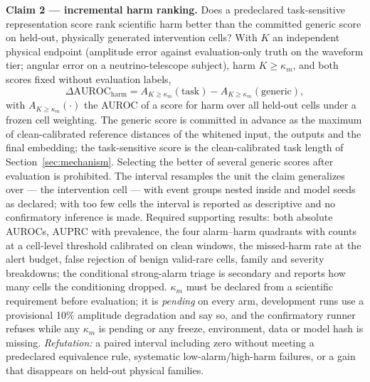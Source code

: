 \documentclass[10pt,twocolumn]{extarticle}
\begin{document}
\textbf{Claim 2 --- incremental harm ranking.} Does a predeclared
task-sensitive representation score rank scientific harm better than the
committed generic score on held-out, physically generated intervention
cells? With $K$ an independent physical endpoint (amplitude error against
evaluation-only truth on the waveform tier; angular error on a
neutrino-telescope subject), harm $K\ge\kappa_m$, and both scores fixed
without evaluation labels,
\[
\Delta\mathrm{AUROC}_{\mathrm{harm}}=A_{K\ge\kappa_m}(\text{task})-A_{K\ge\kappa_m}(\text{generic}),
\]
with $A_{K\ge\kappa_m}(\cdot)$ the AUROC of a score for harm over all
held-out cells under a frozen cell weighting. The generic score is
committed in advance as the maximum of clean-calibrated reference distances of
the whitened input, the outputs and the final embedding; the task-sensitive
score is the clean-calibrated task length of Section~\ref{sec:mechanism}.
Selecting the better of several generic scores after evaluation is
prohibited. The interval resamples the unit the claim generalizes over ---
the intervention cell --- with event groups nested inside and model seeds as
declared; with too few cells the interval is reported as descriptive and no
confirmatory inference is made. Required supporting results: both absolute
AUROCs, AUPRC with prevalence, the four alarm--harm quadrants with counts at a
cell-level threshold calibrated on clean windows, the missed-harm rate at the
alert budget, false rejection of benign valid-rare cells, family and severity
breakdowns; the conditional strong-alarm triage is secondary and reports how
many cells the conditioning dropped. $\kappa_m$ must be declared from a
scientific requirement before evaluation; it is \emph{pending} on every arm,
development runs use a provisional 10\% amplitude degradation and say so, and
the confirmatory runner refuses while any $\kappa_m$ is pending or any
freeze, environment, data or model hash is missing. \emph{Refutation:} a
paired interval including zero without meeting a predeclared equivalence
rule, systematic low-alarm/high-harm failures, or a gain that disappears on
held-out physical families.
\end{document}
